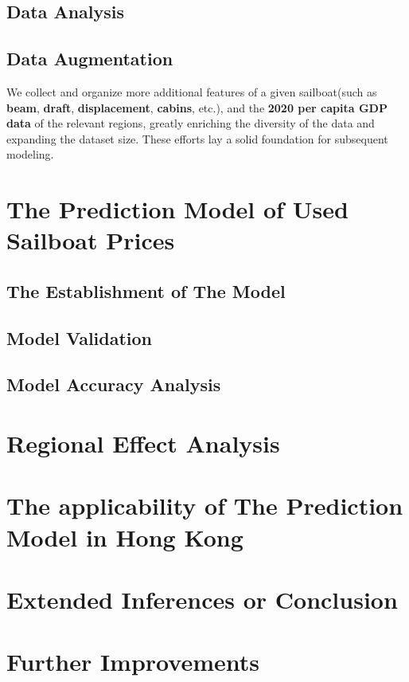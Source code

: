 \documentclass[12pt]{article}  %
\begin{document}
\subsection{Data Analysis}

\subsection{Data Augmentation}
We collect and organize more additional features of a given sailboat(such as \textbf{beam}, \textbf{draft}, \textbf{displacement}, \textbf{cabins}, etc.),
and the \textbf{2020 per capita GDP data} of the relevant regions, 
greatly enriching the diversity of the data and expanding the dataset size. 
These efforts lay a solid foundation for subsequent modeling.

\section{The Prediction Model of Used Sailboat Prices}
\subsection{The Establishment of The Model}

\subsection{Model Validation}
\subsection{Model Accuracy Analysis}


\section{Regional Effect Analysis}

\section{The applicability of The Prediction Model in Hong Kong}

\section{Extended Inferences or Conclusion}

\section{Further Improvements}
\end{document}
